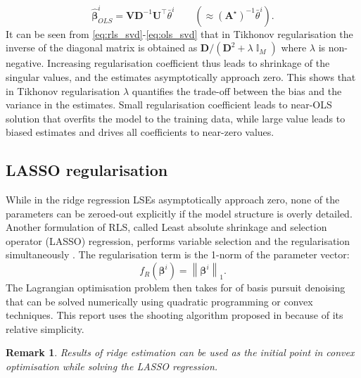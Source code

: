 \documentclass[a4paper,11pt,twoside]{article}
\newcommand{\norm}[1]{\left\lVert#1\right\rVert}
\DeclareMathOperator{\eye}{\mathbb{I}}
\theoremstyle{mytheoremstyle}
\newtheorem{remark}{Remark}[section]
\begin{document}
\begin{equation}\label{eq:ols_svd}
\hat{\mathbf{\beta}}^{i}_{OLS} = \mathbf{V}\mathbf{D}^{-1}\mathbf{U}^{\top}\bar{\theta}^i \qquad \left( \approx (\mathbf{A}^{\star})^{-1}\bar{\theta}^i\right).
\end{equation}
It can be seen from \eqref{eq:rls_svd}-\eqref{eq:ols_svd} that in Tikhonov regularisation the inverse of the diagonal matrix is obtained as $\mathbf{D} / (\mathbf{D}^2  + \lambda \eye_M)$ where $\lambda$ is non-negative. Increasing regularisation coefficient thus leads to shrinkage of the singular values, and the estimates asymptotically approach zero. This shows that in Tikhonov regularisation $\lambda$ quantifies the trade-off between the bias and the variance in the estimates. Small regularisation coefficient leads to near-OLS solution that overfits the model to the training data, while large value leads to biased estimates and drives all coefficients to near-zero values.
\subsection{LASSO regularisation}
\par While in the ridge regression LSEs asymptotically approach zero, none of the parameters can be zeroed-out explicitly if the model structure is overly detailed. Another formulation of RLS, called Least absolute shrinkage and selection operator (LASSO) regression, performs variable selection and the regularisation simultaneously . The regularisation term is the 1-norm of the parameter vector:
\begin{equation}
f_{R}(\mathbf{\beta}^i) = \norm{\mathbf{\beta}^i}_{1}.
\end{equation}
The Lagrangian optimisation problem then takes for of basis pursuit denoising that can be solved numerically using quadratic programming or convex techniques. This report uses the shooting algorithm proposed in \cite{Fu1998} because of its relative simplicity.
\begin{remark}
	Results of ridge estimation can be used as the initial point in convex optimisation while solving the LASSO regression. 
\end{remark}
\end{document}
